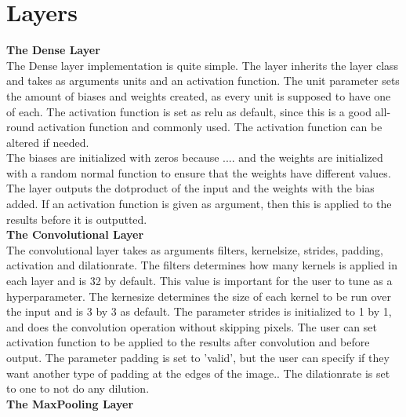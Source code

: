 \section{Layers}

\textbf{The Dense Layer}
\\
The Dense layer implementation is quite simple. The layer inherits the layer class and takes as arguments units and an activation function. The unit parameter sets the amount of biases and weights created, as every unit is supposed to have one of each.  The activation function is set as relu as default, since this is a good all-round activation function and commonly used.  The activation function can be altered if needed.  \\
The biases are initialized with zeros because .... and the weights are initialized with a random normal function to ensure that the weights have different values.  The layer outputs the dotproduct of the input and the weights with the bias added. If an activation function is given as argument, then this is applied to the results before it is outputted. 
\\
\textbf{The Convolutional Layer}
\\
The convolutional layer takes as arguments filters, kernelsize, strides, padding, activation and dilationrate. The filters determines how many kernels is applied in each layer and is 32 by default. This value is important for the user to tune as a hyperparameter. The kernesize determines the size of each kernel to be run over the input and is 3 by 3 as default. The parameter strides is initialized to 1 by 1, and does the convolution operation without skipping pixels. The user can set activation function to be applied to the results after convolution and before output. The parameter padding is set to 'valid',  but the user can specify if they want another type of padding at the edges of the image.. The dilationrate is set to one to not do any dilution. 
\\
\textbf{The MaxPooling Layer}
\\
